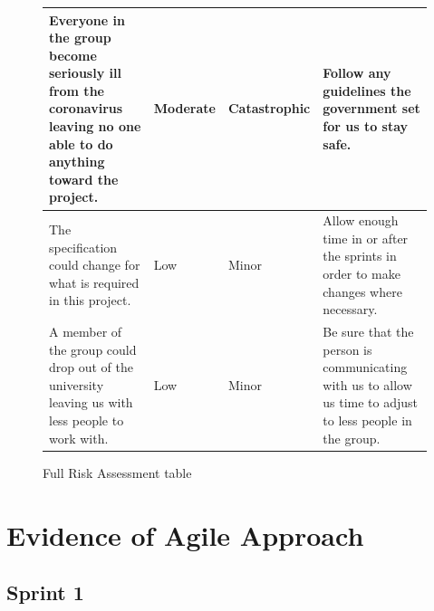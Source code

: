 \documentclass[10pt]{report}
\begin{document}
\begin{figure}[!h]
\begin{longtable}{| p{5.5cm} | p{2cm} | p{2cm} |  p{5.5cm} |}
Everyone in the group become seriously ill from the coronavirus leaving no one able to do anything toward the project.&
Moderate&
Catastrophic&
Follow any guidelines the government set for us to stay safe.\\
\hline

The specification could change for what is required in this project.& 
Low&
Minor&
Allow enough time in or after the sprints in order to make changes where necessary.\\
\hline

A member of the group could drop out of the university leaving us with less people to work with.& 
Low&
Minor&
Be sure that the person is communicating with us to allow us time to adjust to less people in the group.\\
\hline


\end{longtable}

\caption{Full Risk Assessment table}
\label{fig:risks}

\end{figure}

\newpage

\section{Evidence of Agile Approach}
\label{sec:agileapp}

\subsection{Sprint 1}
\end{document}
